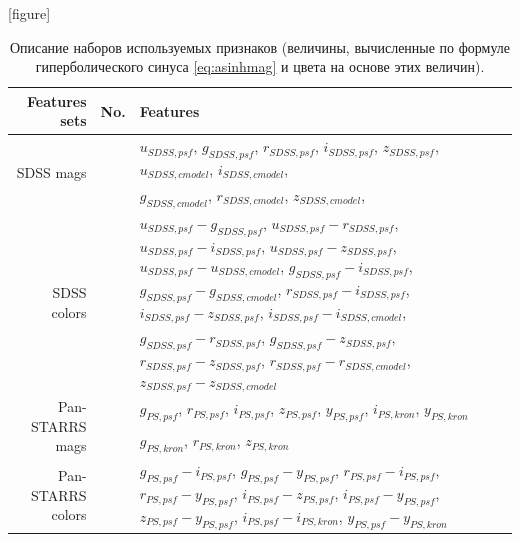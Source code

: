 \documentclass[fleqn,usenatbib]{mnras}
\begin{document}
\begin{table}
    \label{tab:featuressets}
    \caption{Описание наборов используемых признаков (величины, вычисленные по формуле гиперболического синуса \eqref{eq:asinhmag} и цвета на основе этих величин).}
    [figure] 
    \renewcommand{\theFeatsSetNumber}{\arabic{FeatsSetNumber}}
    \setcounter{FeatsSetNumber}{0}
	\begin{tabular}{ r l p{10cm} }
	\hline
	    Features sets & No. & Features \\
    \hline
        \multirow{2}{*}{SDSS mags} & {FeatsSetNumber}\theFeatsSetNumber\label{feats:sdss-mags-1} & \(u_{SDSS,psf}\), \(g_{SDSS,psf}\), \(r_{SDSS,psf}\), \(i_{SDSS,psf}\), \(z_{SDSS,psf}\), \(u_{SDSS,cmodel}\), \(i_{SDSS,cmodel}\), \\
         & {FeatsSetNumber}\theFeatsSetNumber\label{feats:sdss-mags-2} & \(g_{SDSS,cmodel}\), \(r_{SDSS,cmodel}\), \(z_{SDSS,cmodel}\), \\
        \multirow{2}{*}{SDSS colors} & {FeatsSetNumber}\theFeatsSetNumber\label{feats:sdss-colors-1} & \(u_{SDSS,psf}-g_{SDSS,psf}\), \(u_{SDSS,psf}-r_{SDSS,psf}\), \(u_{SDSS,psf}-i_{SDSS,psf}\), \(u_{SDSS,psf}-z_{SDSS,psf}\), \(u_{SDSS,psf}-u_{SDSS,cmodel}\), \(g_{SDSS,psf}-i_{SDSS,psf}\), \(g_{SDSS,psf}-g_{SDSS,cmodel}\), \(r_{SDSS,psf}-i_{SDSS,psf}\), \(i_{SDSS,psf}-z_{SDSS,psf}\), \(i_{SDSS,psf}-i_{SDSS,cmodel}\), \\
         & {FeatsSetNumber}\theFeatsSetNumber\label{feats:sdss-colors-2} & \(g_{SDSS,psf}-r_{SDSS,psf}\), \(g_{SDSS,psf}-z_{SDSS,psf}\), \(r_{SDSS,psf}-z_{SDSS,psf}\), \(r_{SDSS,psf}-r_{SDSS,cmodel}\), \(z_{SDSS,psf}-z_{SDSS,cmodel}\) \\
    \hline
        \multirow{2}{*}{Pan-STARRS mags} & {FeatsSetNumber}\theFeatsSetNumber\label{feats:ps-mags-1} & \(g_{PS,psf}\), \(r_{PS,psf}\), \(i_{PS,psf}\), \(z_{PS,psf}\), \(y_{PS,psf}\), \(i_{PS,kron}\), \(y_{PS,kron}\) \\
         & {FeatsSetNumber}\theFeatsSetNumber\label{feats:ps-mags-2} & \(g_{PS,kron}\), \(r_{PS,kron}\), \(z_{PS,kron}\) \\
        \multirow{2}{*}{Pan-STARRS colors} & {FeatsSetNumber}\theFeatsSetNumber\label{feats:ps-colors-1} & \(g_{PS,psf}-i_{PS,psf}\), \(g_{PS,psf}-y_{PS,psf}\), \(r_{PS,psf}-i_{PS,psf}\), \(r_{PS,psf}-y_{PS,psf}\), \(i_{PS,psf}-z_{PS,psf}\), \(i_{PS,psf}-y_{PS,psf}\), \(z_{PS,psf}-y_{PS,psf}\), \(i_{PS,psf}-i_{PS,kron}\), \(y_{PS,psf}-y_{PS,kron}\) \\

\end{tabular}
\end{table}
\end{document}
